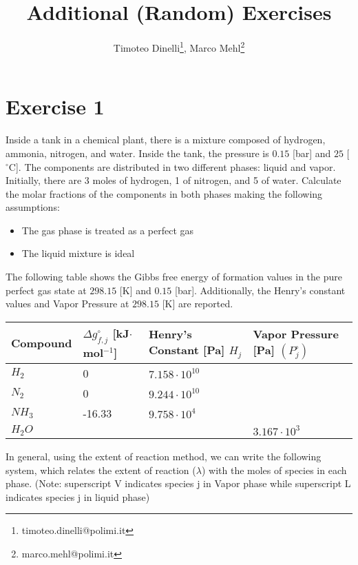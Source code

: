 \documentclass[oneside]{article}
\title{Additional (Random) Exercises}
\author{Timoteo Dinelli\footnote{timoteo.dinelli@polimi.it}, Marco Mehl\footnote{marco.mehl@polimi.it}}
\begin{document}
\maketitle

\section*{Exercise 1}
Inside a tank in a chemical plant, there is a mixture composed of hydrogen, ammonia, nitrogen, and water. Inside the tank, the pressure is $0.15$ [bar] and $25$ [$^{\circ}$C]. The components are distributed in two different phases: liquid and vapor. Initially, there are 3 moles of hydrogen, 1 of nitrogen, and 5 of water. Calculate the molar fractions of the components in both phases making the following assumptions:

\begin{itemize}
   \item The gas phase is treated as a perfect gas
   \item The liquid mixture is ideal
\end{itemize}

The following table shows the Gibbs free energy of formation values in the pure perfect gas state at $298.15$ [K] and $0.15$ [bar]. Additionally, the Henry's constant values and Vapor Pressure at $298.15$ [K] are reported.

\begin{table}[htp]
\begin{tabular}{l|l|l|l}
\textbf{Compound} & $\Delta g^{\circ}_{f,j}$ [kJ$\cdot$mol$^{-1}$] & \textbf{Henry's Constant [Pa] $H_{j}$} & \textbf{Vapor Pressure [Pa] $(P^{\circ}_{j})$} \\
\hline
$H_{2}$       & 0                   & $7.158 \cdot 10^{10}$                &                             \\
$N_{2}$       & 0                   & $9.244 \cdot 10^{10}$                 &                             \\
$NH_{3}$      & -16.33              & $9.758 \cdot 10^{4}$                  &                             \\
$H_{2}O$      &                     &                            & $3.167 \cdot 10^{3}$                  
\end{tabular}
\end{table}

In general, using the extent of reaction method, we can write the following system, which relates the extent of reaction ($\lambda$) with the moles of species in each phase. (Note: superscript V indicates species j in Vapor phase while superscript L indicates species j in liquid phase)
\end{document}
